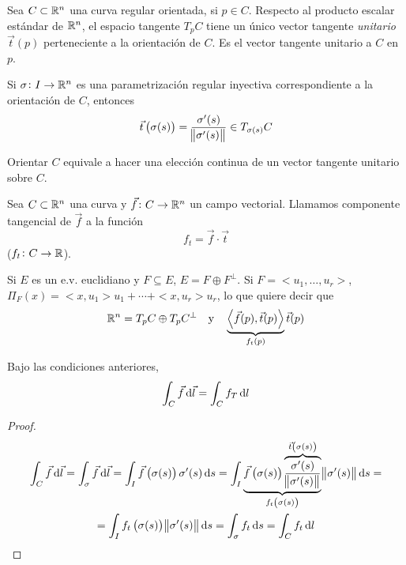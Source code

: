 \begin{prop}
    Sea $C \subset \mathbb{R}^n$ una curva regular orientada, si $p \in C$. Respecto al producto escalar estándar de $\mathbb{R}^n$, el
    espacio tangente $T_pC$ tiene un único vector tangente \emph{unitario} $\vec{t}(p)$ perteneciente a la orientación de $C$. Es
    el vector tangente unitario a $C$ en $p$.

    Si $\sigma \colon I \to \mathbb{R}^n$ es una parametrización regular inyectiva correspondiente a la orientación de $C$, entonces
    \[
        \vec{t}\left( \sigma(s) \right) = \frac{\sigma^\prime(s)}{\norm{\sigma^\prime(s)}} \in T_{\sigma(s)}C
    \]
\end{prop}
\begin{obs*}
    Orientar $C$ equivale a hacer una elección continua de un vector tangente unitario sobre $C$.
\end{obs*}

\begin{defi}
    Sea $C \subset \mathbb{R}^n$ una curva y $\vec{f} \colon C \to \mathbb{R}^n$ un campo vectorial. Llamamos componente tangencial de $\vec{f}$ a
    la función
    \[
        f_t = \vec{f} \cdot \vec{t}
    \]
    ($f_t \colon C \to \mathbb{R}$).
\end{defi}

\begin{obs*}
    Si $E$ es un e.v. euclidiano y $F \subseteq E$, $E = F \oplus F^\perp$. Si $F = <u_1, \dots, u_r>$, $\Pi_F(x) = <x,u_1>u_1 + \cdots + <x,u_r>u_r$, lo
    que quiere decir que
    \[
        \mathbb{R}^n = T_pC \oplus T_pC^\perp \quad \text{y} \quad \underbrace{\left< \vec{f}(p), \vec{t}(p) \right>}_{f_t(p)}\vec{t}(p)
    \]
\end{obs*}

\begin{prop}
    Bajo las condiciones anteriores,
    \[
        \int_C \vec{f} \dif \vec{l} = \int_C f_T \dif l
    \]
\end{prop}

\begin{proof}
    \begin{gather*}
        \int_C \vec{f} \dif \vec{l} = \int_\sigma \vec{f} \dif \vec{l} = \int_I \vec{f}\left( \sigma(s) \right)\sigma^\prime(s) \dif s =
        \int_I \underbrace{\vec{f}\left( \sigma(s) \right) \overbrace{\frac{\sigma^\prime(s)}{\norm{\sigma^\prime(s)}}}^{\vec{t}\left( \sigma(s) \right)}}_
        {f_t\left( \sigma(s) \right)} \norm{\sigma^\prime(s)} \dif s = \\ = \int_I f_t\left( \sigma(s) \right) \norm{\sigma^\prime(s)} \dif s =
        \int_\sigma f_t \dif s = \int_C f_t \dif l
    \end{gather*}
\end{proof}

